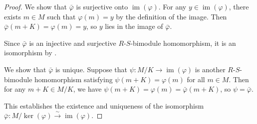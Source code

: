 \begin{proof}
    We show that $\bar{\varphi}$ is surjective onto $\operatorname{im}(\varphi)$. For any $y \in \operatorname{im}(\varphi)$, there exists $m \in M$ such that $\varphi(m) = y$ by the definition of the image. Then $\bar{\varphi}(m + K) = \varphi(m) = y$, so $y$ lies in the image of $\bar{\varphi}$.

    Since $\bar{\varphi}$ is an injective and surjective $R$-$S$-bimodule homomorphism, it is an isomorphism by .

    We show that $\bar{\varphi}$ is unique. Suppose that $\psi : M/K \to \operatorname{im}(\varphi)$ is another $R$-$S$-bimodule homomorphism satisfying $\psi(m + K) = \varphi(m)$ for all $m \in M$. Then for any $m + K \in M/K$, we have $\psi(m + K) = \varphi(m) = \bar{\varphi}(m + K)$, so $\psi = \bar{\varphi}$.

    This establishes the existence and uniqueness of the isomorphism $\bar{\varphi} : M/\ker(\varphi) \xrightarrow{\,\sim\,} \operatorname{im}(\varphi)$.
\end{proof}